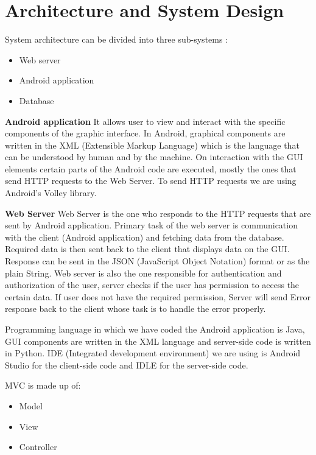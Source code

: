 \chapter{Architecture and System Design}

System architecture can be divided into three sub-systems :
\begin{itemize}
	\item 	 Web server
	\item 	 Android application
	\item 	 Database
\end{itemize}

\textbf{Android application}
It allows user to view and interact with the specific components of the graphic interface. In Android, graphical components are written in the XML (Extensible Markup Language) which is the language that can be understood by human and by the machine. On interaction with the GUI elements certain parts of the Android code are executed, mostly the ones that send HTTP requests to the Web Server. To send HTTP requests we are using Android’s Volley library.

\textbf{Web Server}
Web Server is the one who responds to the HTTP requests that are sent by Android application. Primary task of the web server is communication with the client (Android application) and fetching data from the database. Required data is then sent back to the client that displays data on the GUI. Response can be sent in the JSON (JavaScript Object Notation) format or as the plain String. Web server is also the one responsible for authentication and authorization of the user, server checks if the user has permission to access the certain data. If user does not have the required permission, Server will send Error response back to the client whose task is to handle the error properly.

Programming language in which we have coded the Android application is Java, GUI components are written in the XML language and server-side code is written in Python. IDE (Integrated development environment) we are using is Android Studio for the client-side code and IDLE for the server-side code.

MVC is made up of:

\begin{itemize}
	\item 	 Model
	\item 	 View
	\item 	 Controller		
\end{itemize}

